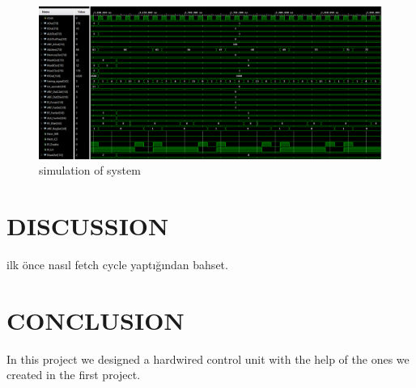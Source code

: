 \documentclass[pdftex,12pt,a4paper]{article}
\begin{document}
\begin{figure}[H]
    \centering
    \includegraphics[width=1\textwidth]{photos/system_result_13.png}	
    \caption{simulation of system}
    \label{implementation}
\end{figure}




\section{DISCUSSION}

ilk önce nasıl fetch cycle yaptığından bahset. 




\section{CONCLUSION}
In this project we designed a hardwired control unit with the help of the ones we created in the first project. 
\end{document}

